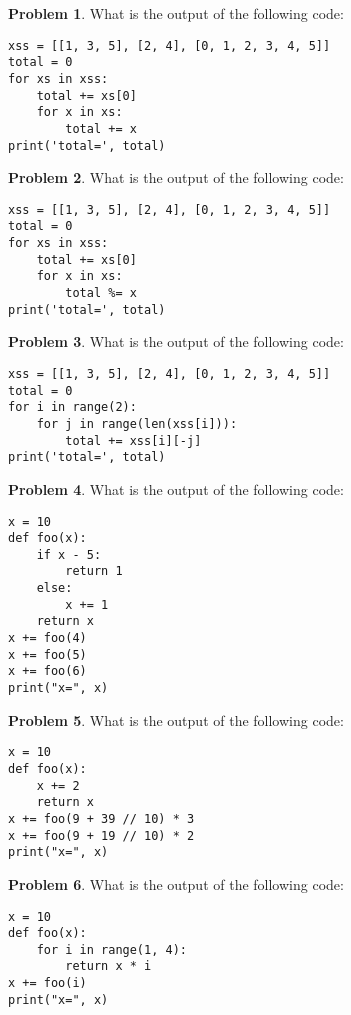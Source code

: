 \documentclass[10pt]{article}
\theoremstyle{definition}
\newtheorem{problem}{Problem}
\begin{document}
\newpage
\begin{problem}
    What is the output of the following code:
\end{problem}
\begin{lstlisting}
xss = [[1, 3, 5], [2, 4], [0, 1, 2, 3, 4, 5]]
total = 0
for xs in xss:
    total += xs[0]
    for x in xs:
        total += x
print('total=', total)
\end{lstlisting}
\vspace{0.15in}

\begin{problem}
    What is the output of the following code:
\end{problem}
\begin{lstlisting}
xss = [[1, 3, 5], [2, 4], [0, 1, 2, 3, 4, 5]]
total = 0
for xs in xss:
    total += xs[0]
    for x in xs:
        total %= x
print('total=', total)
\end{lstlisting}
\vspace{0.15in}


\begin{problem}
    What is the output of the following code:
\end{problem}
\begin{lstlisting}
xss = [[1, 3, 5], [2, 4], [0, 1, 2, 3, 4, 5]]
total = 0
for i in range(2):
    for j in range(len(xss[i])):
        total += xss[i][-j]
print('total=', total)
\end{lstlisting}
\vspace{0.15in}

\newpage
\begin{problem}
    What is the output of the following code:
\end{problem}
\begin{lstlisting}
x = 10
def foo(x):
    if x - 5:
        return 1
    else:
        x += 1
    return x
x += foo(4)
x += foo(5)
x += foo(6)
print("x=", x)
\end{lstlisting}
\vspace{0.15in}

\begin{problem}
    What is the output of the following code:
\end{problem}
\begin{lstlisting}
x = 10 
def foo(x):
    x += 2
    return x
x += foo(9 + 39 // 10) * 3
x += foo(9 + 19 // 10) * 2
print("x=", x)
\end{lstlisting}
\vspace{0.15in}

\begin{problem}
    What is the output of the following code:
\end{problem}
\begin{lstlisting}
x = 10
def foo(x):
    for i in range(1, 4):
        return x * i
x += foo(i)
print("x=", x)
\end{lstlisting}
\vspace{0.15in}
\end{document}
